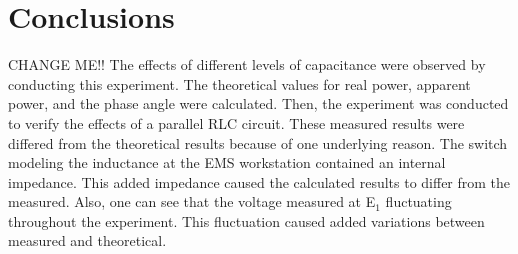 \documentclass{article}
\begin{document}
\section{Conclusions}
CHANGE ME!!  The effects of different levels of capacitance were observed by
conducting this experiment. The theoretical values for real power, apparent
power, and the phase angle were calculated. Then, the experiment was conducted
to verify the effects of a parallel RLC circuit. These measured results were
differed from the theoretical results because of one underlying reason. The
switch modeling the inductance at the EMS workstation contained an internal
impedance.  This added impedance caused the calculated results to differ from
the measured.  Also, one can see that the voltage measured at E$_1$ fluctuating
throughout the experiment. This fluctuation caused added variations between
measured and theoretical.
\end{document}
